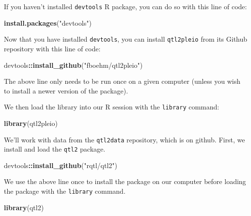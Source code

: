 \documentclass{book}
\newenvironment{Shaded}{\begin{snugshade}}{\end{snugshade}}
\newcommand{\KeywordTok}[1]{\textcolor[rgb]{0.13,0.29,0.53}{\textbf{#1}}}
\newcommand{\NormalTok}[1]{#1}
\newcommand{\OperatorTok}[1]{\textcolor[rgb]{0.81,0.36,0.00}{\textbf{#1}}}
\newcommand{\StringTok}[1]{\textcolor[rgb]{0.31,0.60,0.02}{#1}}
\begin{document}
If you haven't installed \texttt{devtools} R package, you can do so with
this line of code:

\begin{Shaded}
\begin{Highlighting}[]
\KeywordTok{install.packages}\NormalTok{(}\StringTok{"devtools"}\NormalTok{)}
\end{Highlighting}
\end{Shaded}

Now that you have installed \texttt{devtools}, you can install
\texttt{qtl2pleio} from its Github repository with this line of code:

\begin{Shaded}
\begin{Highlighting}[]
\NormalTok{devtools}\OperatorTok{::}\KeywordTok{install_github}\NormalTok{(}\StringTok{"fboehm/qtl2pleio"}\NormalTok{)}
\end{Highlighting}
\end{Shaded}

The above line only needs to be run once on a given computer (unless you
wish to install a newer version of the package).

We then load the library into our R session with the \texttt{library}
command:

\begin{Shaded}
\begin{Highlighting}[]
\KeywordTok{library}\NormalTok{(qtl2pleio)}
\end{Highlighting}
\end{Shaded}

We'll work with data from the \texttt{qtl2data} repository, which is on
github. First, we install and load the \texttt{qtl2} package.

\begin{Shaded}
\begin{Highlighting}[]
\NormalTok{devtools}\OperatorTok{::}\KeywordTok{install_github}\NormalTok{(}\StringTok{"rqtl/qtl2"}\NormalTok{)}
\end{Highlighting}
\end{Shaded}

We use the above line once to install the package on our computer before
loading the package with the \texttt{library} command.

\begin{Shaded}
\begin{Highlighting}[]
\KeywordTok{library}\NormalTok{(qtl2)}
\end{Highlighting}
\end{Shaded}
\end{document}
